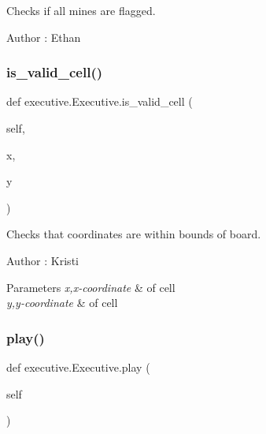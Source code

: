 Checks if all mines are flagged. 

\begin{DoxyAuthor}{Author}
\+: Ethan 
\end{DoxyAuthor}
\mbox{\label{classexecutive_1_1_executive_aa44d8e9965ea2e73d9e22c81208b8819}} 
\subsubsection{\texorpdfstring{is\+\_\+valid\+\_\+cell()}{is\_valid\_cell()}}
{\footnotesize\ttfamily def executive.\+Executive.\+is\+\_\+valid\+\_\+cell (\begin{DoxyParamCaption}\item[{}]{self,  }\item[{}]{x,  }\item[{}]{y }\end{DoxyParamCaption})}



Checks that coordinates are within bounds of board. 

\begin{DoxyAuthor}{Author}
\+: Kristi 
\end{DoxyAuthor}

\begin{DoxyParams}{Parameters}
{\em x,x-\/coordinate} & of cell \\
\hline
{\em y,y-\/coordinate} & of cell \\
\hline
\end{DoxyParams}
\mbox{\label{classexecutive_1_1_executive_a127200710d2bdb34a902c703928ab93a}} 
\subsubsection{\texorpdfstring{play()}{play()}}
{\footnotesize\ttfamily def executive.\+Executive.\+play (\begin{DoxyParamCaption}\item[{}]{self }\end{DoxyParamCaption})}



